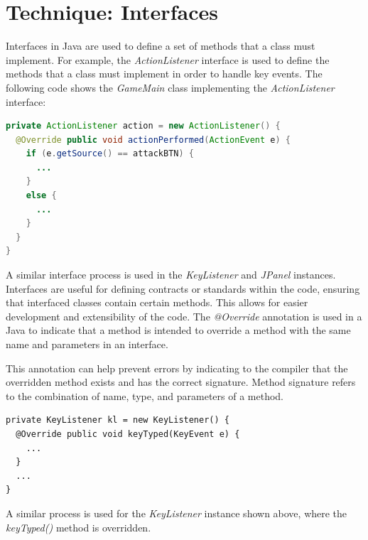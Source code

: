 \documentclass[titlepage]{article}
\begin{document}
\pagebreak
\section{Technique: Interfaces}

Interfaces in Java are used to define a set of methods that a class must implement. For example, the \emph{ActionListener} interface is used to define the methods that a class must implement in order to handle key events. The following code shows the \emph{GameMain} class implementing the \emph{ActionListener} interface:

\begin{lstlisting}[language=Java]
private ActionListener action = new ActionListener() {
  @Override public void actionPerformed(ActionEvent e) {
    if (e.getSource() == attackBTN) {
      ...
    }
    else {
      ...
    }
  }
}
\end{lstlisting}

A similar interface process is used in the \emph{KeyListener} and \emph{JPanel} instances. Interfaces are useful for defining contracts or standards within the code, ensuring that interfaced classes contain certain methods. This allows for easier development and extensibility of the code.
The \emph{@Override} annotation is used in a Java to indicate that a method is intended to override a method with the same name and parameters in an interface. 

This annotation can help prevent errors by indicating to the compiler that the overridden method exists and has the correct signature. Method signature refers to the combination of name, type, and parameters of a method.
\begin{lstlisting}
private KeyListener kl = new KeyListener() {
  @Override public void keyTyped(KeyEvent e) {
    ...
  }
  ...
}
\end{lstlisting}

A similar process is used for the \emph{KeyListener} instance shown above, where the \emph{keyTyped()} method is overridden.





\pagebreak
\end{document}
